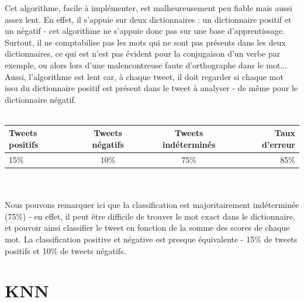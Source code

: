 \documentclass[pdftex,12pt,a4paper]{report}
\begin{document}
\begin{spacing}{1.2}
Cet algorithme, facile à implémenter, est malheureusement peu fiable mais aussi assez lent. En effet, il s'appuie sur deux dictionnaires : un dictionnaire positif et un négatif - cet algorithme ne s'appuie donc pas sur une base d'apprentissage. Surtout, il ne comptabilise pas les mots qui ne sont pas présents dans les deux dictionnaires, ce qui est n'est pas évident pour la conjugaison d'un verbe par exemple, ou alors lors d'une malencontreuse faute d'orthographe dans le mot...
\\
Aussi, l'algorithme est lent car, à chaque tweet, il doit regarder si chaque mot issu du dictionnaire positif est présent dans le tweet à analyser - de même pour le dictionnaire négatif.
\\
\\
\begin{tabular}{|l|c|c|r|}
  \hline
  \textbf{Tweets positifs} & \textbf{Tweets négatifs} & \textbf{Tweets indéterminés} & \textbf{Taux d'erreur}\\
  \hline
  15\% & 10\% & 75\% & 85\%\\
  \hline
\end{tabular}
\\
\\
Nous pouvons remarquer ici que la classification est majoritairement indéterminée (75\%) - en effet, il peut être difficile de trouver le mot exact dans le dictionnaire, et pouvoir ainsi classifier le tweet en fonction de la somme des scores de chaque mot. La classification positive et négative est presque équivalente - 15\% de tweets positifs et 10\% de tweets négatifs.

\section{KNN}


\end{spacing}
\end{document}
